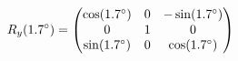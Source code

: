 \documentclass[preview]{standalone}
\begin{document}
\begin{align*}
\special{dvisvgm:raw <g id='unique000'>}R_y(1.7^\circ) = \begin{pmatrix} \cos(1.7^\circ) & 0 & -\sin(1.7^\circ) \\ 0 & 1 & 0 \\ \sin(1.7^\circ) & 0 & \cos(1.7^\circ) \end{pmatrix}\special{dvisvgm:raw </g>}
\end{align*}
\end{document}
